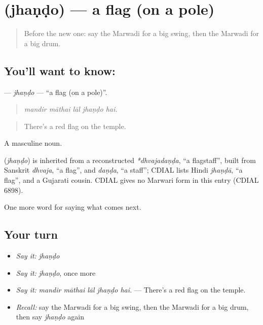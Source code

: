 \section[\texorpdfstring{\mw{झंडो} (jhaṇḍo)}{झंडो (jhaṇḍo)}]{ (jhaṇḍo) — a flag (on a pole)}

\label{lesson:MW-C223-jhando}



\begin{quote}
Before the new one: say the Marwadi for a big swing, then the Marwadi for a big drum.
\end{quote}

\subsection*{You'll want to know: }
\textbf{} — \emph{jhaṇḍo} — \textquotedblleft{}a flag (on a pole)\textquotedblright{}.

\begin{quote}
    
\end{quote}

\begin{quote}
\emph{mandir māthai lāl jhaṇḍo hai.}
\end{quote}

\begin{quote}
There's a red flag on the temple.
\end{quote}

A masculine noun.

\begin{cousinweb}
\textbf{} (\emph{jhaṇḍo}) is inherited from a reconstructed \emph{*dhvajadaṇḍa}, \textquotedblleft{}a flagstaff\textquotedblright{}, built from Sanskrit \emph{dhvaja}, \textquotedblleft{}a flag\textquotedblright{}, and \emph{daṇḍa}, \textquotedblleft{}a staff\textquotedblright{}; CDIAL lists Hindi \emph{jhaṇḍā}, \textquotedblleft{}a flag\textquotedblright{}, and a Gujarati cousin. CDIAL gives no Marwari form in this entry (CDIAL 6898).
\end{cousinweb}

\begin{grammarlens}[title={What you've built}]
One more word for saying what comes next.
\end{grammarlens}

\subsection*{Your turn}
\begin{itemize}
\raggedright
  \item \emph{Say it:} \emph{jhaṇḍo}
  \item \emph{Say it:} \emph{jhaṇḍo}, once more
  \item \emph{Say it:} \emph{mandir māthai lāl jhaṇḍo hai.} — There's a red flag on the temple.
  \item \emph{Recall:} say the Marwadi for a big swing, then the Marwadi for a big drum, then say \emph{jhaṇḍo} again
\end{itemize}

